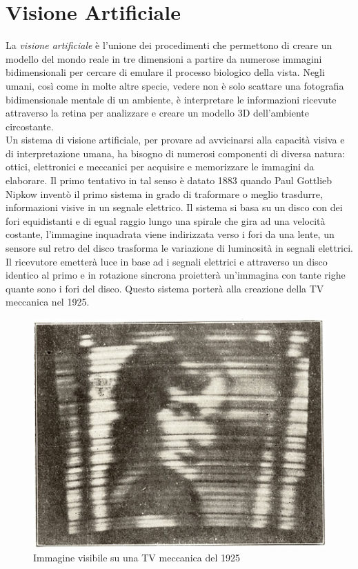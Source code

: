 \chapter{Visione Artificiale}
\fancyfoot[C]{\thepage } 
La \textit{visione artificiale} è l'unione dei procedimenti che permettono di 
creare  un modello del mondo reale in tre dimensioni a partire da numerose 
immagini bidimensionali per cercare di emulare il processo biologico della vista.
Negli umani, così come in molte altre specie, vedere non è solo scattare una 
fotografia bidimensionale mentale di un ambiente, è interpretare le informazioni
ricevute attraverso la retina per analizzare e creare un modello 3D dell'ambiente
 circostante.\\	
Un sistema di visione artificiale, per provare ad avvicinarsi alla capacità visiva
e di interpretazione umana, ha bisogno di numerosi componenti di diversa natura: 
ottici, elettronici e meccanici per acquisire e memorizzare le immagini da elaborare.
Il primo tentativo in tal senso è datato 1883 quando  Paul Gottlieb Nipkow 
inventò il primo sistema 
in grado di traformare o meglio trasdurre, informazioni visive in un segnale elettrico. Il sistema
 si basa su un disco con dei fori equidistanti e di egual raggio lungo una 
 spirale che gira ad una velocità costante, l'immagine inquadrata viene indirizzata 
 verso i fori da una lente, un sensore sul retro del disco trasforma le variazione 
 di luminosità in segnali elettrici. Il ricevutore emetterà luce in base ad i 
 segnali elettrici e attraverso un disco identico al primo e in rotazione sincrona 
 proietterà un'immagina con tante righe quante sono i fori del disco.
 Questo sistema porterà alla creazione della TV meccanica nel 1925.
 \begin{figure}[!htb] \center
\includegraphics[width=\textwidth]{immagini/tv_meccanica.png}
\caption{Immagine visibile su una TV meccanica del 1925} 
\end{figure}
